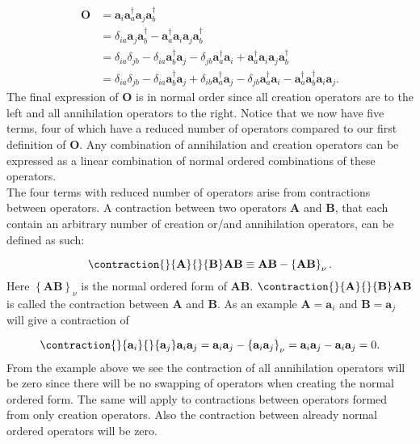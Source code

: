 \begin{align}
\textbf{O} & = 
\textbf{a}_i 
\textbf{a}^{\dag}_a 
\textbf{a}_j 
\textbf{a}^{\dag}_b \label{normalorder} \\ &
= \delta_{ia} 
\textbf{a}_j 
\textbf{a}^{\dag}_b - 
\textbf{a}^{\dag}_a 
\textbf{a}_i  
\textbf{a}_j 
\textbf{a}^{\dag}_b \nonumber \\ &
= \delta_{ia} \delta_{jb} -
\delta_{ia} 
\textbf{a}^{\dag}_b
\textbf{a}_j -
\delta_{jb}
\textbf{a}^{\dag}_a
\textbf{a}_i +
\textbf{a}^{\dag}_a
\textbf{a}_i
\textbf{a}_j
\textbf{a}^{\dag}_b \nonumber \\ &
= \delta_{ia} \delta_{jb} - 
\delta_{ia} 
\textbf{a}^{\dag}_b
\textbf{a}_j +
\delta_{ib} 
\textbf{a}^{\dag}_a
\textbf{a}_j -
\delta_{jb} 
\textbf{a}^{\dag}_a
\textbf{a}_i -
\textbf{a}^{\dag}_a
\textbf{a}^{\dag}_b
\textbf{a}_i
\textbf{a}_j .
\end{align}
The final expression of $\textbf{O}$ is in normal order since all creation operators are to the left and all annihilation operators to the right. Notice that we now have five terms, four of which have a reduced number of operators compared to our first definition of $\textbf{O}$. Any combination of annihilation and creation operators can be expressed as a linear combination of normal ordered combinations of these operators. \\

The four terms with reduced number of operators arise from contractions between operators. A contraction between two operators $\textbf{A}$ and $\textbf{B}$, that each contain an arbitrary number of creation or/and annihilation operators, can be defined as such:

\begin{equation}
\contraction{}{\textbf{A}}{}{\textbf{B}}
\textbf{A}\textbf{B}
 \equiv \textbf{A}\textbf{B} - \left\{ \textbf{A}\textbf{B} \right\}_{\nu} .
\end{equation}
Here $\left\{ \textbf{A}\textbf{B} \right\}_{\nu}$ is the normal ordered form of $\textbf{A}\textbf{B}$. $\contraction{}{\textbf{A}}{}{\textbf{B}}
\textbf{A}\textbf{B}$ is called the contraction between $\textbf{A}$ and $\textbf{B}$. As an example $\textbf{A} = \textbf{a}_i$ and $\textbf{B} = \textbf{a}_j$ will give a contraction of

\begin{equation}
\contraction{}{\textbf{a}_i}{}{\textbf{a}_j}
\textbf{a}_i\textbf{a}_j
= \textbf{a}_i \textbf{a}_j - \left\{ \textbf{a}_i \textbf{a}_j \right\}_{\nu} = \textbf{a}_i \textbf{a}_j - \textbf{a}_i \textbf{a}_j = 0 . \label{wickexample1}
\end{equation}
From the example above we see the contraction of all annihilation operators will be zero since there will be no swapping of operators when creating the normal ordered form. The same will apply to contractions between operators formed from only creation operators. Also the contraction between already normal ordered operators will be zero. \\

